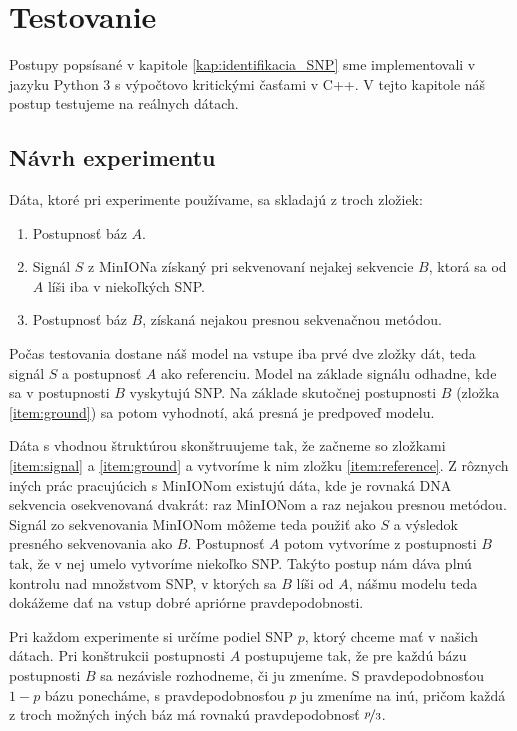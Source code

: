 \chapter{Testovanie}

\label{kap:testovanie}

Postupy popsísané v kapitole \ref{kap:identifikacia_SNP} sme implementovali v jazyku Python 3 s
výpočtovo kritickými časťami v C++.
V tejto kapitole náš postup testujeme na reálnych dátach.


\section{Návrh experimentu}

Dáta, ktoré pri experimente používame, sa skladajú z troch zložiek:

\begin{enumerate}
\item \label{item:reference} Postupnosť báz $A$.
\item \label{item:signal} Signál $S$ z MinIONa získaný pri sekvenovaní nejakej sekvencie $B$, 
ktorá sa od $A$ líši iba v niekoľkých SNP.
\item \label{item:ground} Postupnosť báz $B$, získaná nejakou presnou sekvenačnou metódou.
\end{enumerate}

Počas testovania dostane náš model na vstupe iba prvé dve zložky dát, teda signál $S$ a postupnosť $A$ 
ako referenciu. Model na základe signálu odhadne, kde sa v postupnosti $B$ vyskytujú SNP. Na základe
skutočnej postupnosti $B$ (zložka \ref{item:ground}) sa potom vyhodnotí, aká presná je predpoveď modelu.

Dáta s vhodnou štruktúrou skonštruujeme tak, že začneme so zložkami \ref{item:signal} a 
\ref{item:ground} a vytvoríme k nim zložku \ref{item:reference}. Z rôznych iných prác pracujúcich
s MinIONom existujú dáta, kde je rovnaká DNA sekvencia osekvenovaná dvakrát: raz MinIONom a raz nejakou 
presnou metódou. Signál zo sekvenovania MinIONom môžeme teda použiť ako $S$ a výsledok presného 
sekvenovania ako $B$. Postupnosť $A$ potom vytvoríme z postupnosti $B$ tak, že v nej umelo vytvoríme
niekoľko SNP. Takýto postup nám dáva plnú kontrolu nad množstvom SNP, v ktorých sa $B$ líši od $A$,
nášmu modelu teda dokážeme dať na vstup dobré apriórne pravdepodobnosti.

Pri každom experimente si určíme podiel SNP $p$, ktorý chceme mať v našich dátach. Pri konštrukcii
postupnosti $A$ postupujeme tak, že pre každú bázu postupnosti $B$ sa nezávisle rozhodneme, či ju
zmeníme. S pravdepodobnosťou $1-p$ bázu ponecháme, s pravdepodobnosťou $p$ ju zmeníme na inú, pričom
každá z troch možných iných báz má rovnakú pravdepodobnosť $\nicefrac{p}{3}$.


